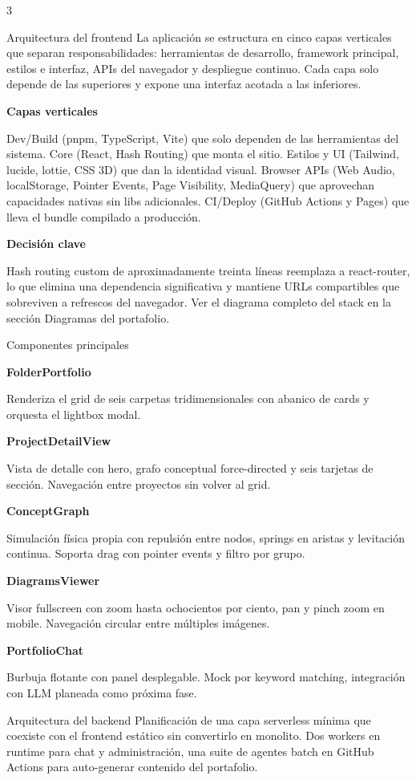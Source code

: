 \documentclass[10pt]{article}
\newcommand{\posterheading}[1]{%
  \vspace{4pt}%
  \par{\color{accentdark}\sffamily\bfseries #1}\par
  \vspace{2pt}%
}
\begin{document}
\begin{multicols}{3}

\begin{posterblock}{Arquitectura del frontend}
La aplicación se estructura en cinco capas verticales que separan responsabilidades: herramientas de desarrollo, framework principal, estilos e interfaz, APIs del navegador y despliegue continuo. Cada capa solo depende de las superiores y expone una interfaz acotada a las inferiores.

\posterheading{Capas verticales}
Dev/Build (pnpm, TypeScript, Vite) que solo dependen de las herramientas del sistema. Core (React, Hash Routing) que monta el sitio. Estilos y UI (Tailwind, lucide, lottie, CSS 3D) que dan la identidad visual. Browser APIs (Web Audio, localStorage, Pointer Events, Page Visibility, MediaQuery) que aprovechan capacidades nativas sin libs adicionales. CI/Deploy (GitHub Actions y Pages) que lleva el bundle compilado a producción.

\posterheading{Decisión clave}
Hash routing custom de aproximadamente treinta líneas reemplaza a react-router, lo que elimina una dependencia significativa y mantiene URLs compartibles que sobreviven a refrescos del navegador. Ver el diagrama completo del stack en la sección Diagramas del portafolio.
\end{posterblock}

\begin{posterblock}{Componentes principales}
\posterheading{FolderPortfolio}
Renderiza el grid de seis carpetas tridimensionales con abanico de cards y orquesta el lightbox modal.

\posterheading{ProjectDetailView}
Vista de detalle con hero, grafo conceptual force-directed y seis tarjetas de sección. Navegación entre proyectos sin volver al grid.

\posterheading{ConceptGraph}
Simulación física propia con repulsión entre nodos, springs en aristas y levitación continua. Soporta drag con pointer events y filtro por grupo.

\posterheading{DiagramsViewer}
Visor fullscreen con zoom hasta ochocientos por ciento, pan y pinch zoom en mobile. Navegación circular entre múltiples imágenes.

\posterheading{PortfolioChat}
Burbuja flotante con panel desplegable. Mock por keyword matching, integración con LLM planeada como próxima fase.
\end{posterblock}


\begin{posterblock}{Arquitectura del backend}
Planificación de una capa serverless mínima que coexiste con el frontend estático sin convertirlo en monolito. Dos workers en runtime para chat y administración, una suite de agentes batch en GitHub Actions para auto-generar contenido del portafolio.


\end{posterblock}
\end{multicols}
\end{document}
